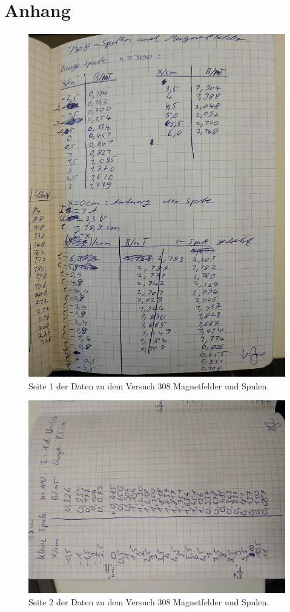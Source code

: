 \section{Anhang}

\begin{figure}
\centering
\includegraphics[height=15cm]{content/daten1.jpg}
\caption{Seite 1 der Daten zu dem Versuch 308 Magnetfelder und Spulen.}
\end{figure}

\begin{figure}
\centering
\includegraphics[width=\textwidth,angle=270]{content/daten2.jpg}
\caption{Seite 2 der Daten zu dem Versuch 308 Magnetfelder und Spulen.}
\end{figure}

